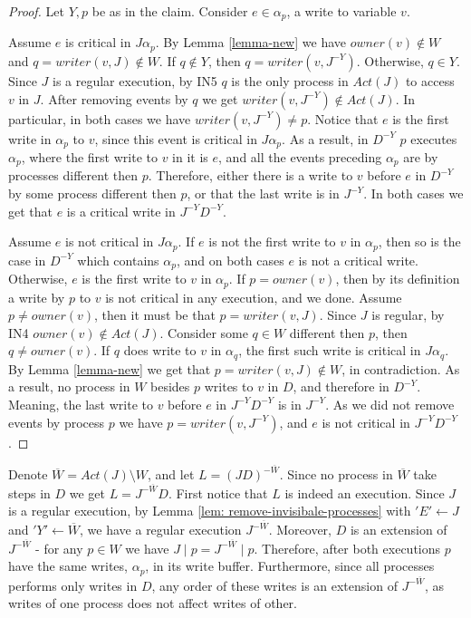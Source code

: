 \begin{proof}
	Let $Y,p$ be as in the claim. Consider $e \in \alpha_p$, a write to variable $v$. 
	
	Assume $e$ is critical in $J \alpha_p$. By Lemma \ref{lemma-new} we have $owner(v) \notin W$ and $q = writer(v,J) \notin W$. If $q \notin Y$, then $q = writer(v,J^{-Y})$. Otherwise, $q \in Y$. Since $J$ is a regular execution, by IN5 $q$ is the only process in $Act(J)$ to access $v$ in $J$. After removing events by $q$ we get $writer(v,J^{-Y}) \notin Act(J)$. In particular, in both cases we have $writer(v,J^{-Y}) \neq p$.
	Notice that $e$ is the first write in $\alpha_p$ to $v$, since this event is critical in $J \alpha_p$. As a result, in $D^{-Y}$ $p$ executes $\alpha_p$, where the first write to $v$ in it is $e$, and all the events preceding $\alpha_p$ are by processes different then $p$. Therefore, either there is a write to $v$ before $e$ in $D^{-Y}$ by some process different then $p$, or that the last write is in $J^{-Y}$. In both cases we get that $e$ is a critical write in $J^{-Y} D^{-Y}$.
	
	Assume $e$ is not critical in $J \alpha_p$. If $e$ is not the first write to $v$ in $\alpha_p$, then so is the case in $D^{-Y}$ which contains $\alpha_p$, and on both cases $e$ is not a critical write. Otherwise, $e$ is the first write to $v$ in $\alpha_p$.
	If $p = owner(v)$, then by its definition a write by $p$ to $v$ is not critical in any execution, and we done. Assume $p \neq owner(v)$, then it must be that $p = writer(v,J)$. Since $J$ is regular, by IN4 $owner(v) \notin Act(J)$. Consider some $q \in W$ different then $p$, then $q \neq owner(v)$. If $q$ does write to $v$ in $\alpha_q$, the first such write is critical in $J \alpha_q$. By Lemma \ref{lemma-new} we get that $p=writer(v,J) \notin W$, in contradiction. As a result, no process in $W$ besides $p$ writes to $v$ in $D$, and therefore in $D^{-Y}$. Meaning, the last write to $v$ before $e$ in $J^{-Y} D^{-Y}$ is in $J^{-Y}$. As we did not remove events by process $p$ we have $p = writer(v,J^{-Y})$, and $e$ is not critical in $J^{-Y} D^{-Y}$.
\end{proof}

Denote $\overline{W} = Act(J) \setminus W$, and let $L = (J D)^{-\overline{W}}$. Since no process in $\overline{W}$ take steps in $D$ we get $L = J^{-\overline{W}} D$.
First notice that $L$ is indeed an execution. Since $J$ is a regular execution, by Lemma \ref{lem: remove-invisibale-processes} with $'E' \leftarrow J$ and $'Y' \leftarrow \overline{W}$, we have a regular execution $J^{-\overline{W}}$. Moreover, $D$ is an extension of $J^{-\overline{W}}$ - for any $p \in W$ we have $J \mid p = J^{-\overline{W}} \mid p$. Therefore, after both executions $p$ have the same writes, $\alpha_p$, in its write buffer. Furthermore, since all processes performs only writes in $D$, any order of these writes is an extension of $J^{-\overline{W}}$, as writes of one process does not affect writes of other.


